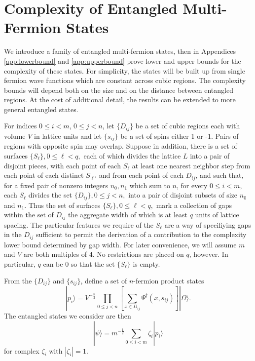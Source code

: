 \documentclass[twocolumn,amsmath,amssymb]{revtex4-1}
\begin{document}
\section{\label{sec:entangledstates} Complexity of Entangled Multi-Fermion States}

We introduce a family of entangled multi-fermion states, then in 
Appendices \ref{app:lowerbound} and \ref{app:upperbound}
prove lower and upper bounds for the complexity of these states.
For simplicity, the states will be built up from single fermion wave functions which
are constant across cubic regions. The complexity bounds
will depend both on the size and on the distance
between entangled regions.
At the cost of additional detail, the results can
be extended to more general entangled states.

For indices $0 \leq i < m $, $0 \leq j < n$, let $\{ D_{ij} \}$ be a set of 
cubic regions each with
volume $V$ in lattice units
and let $\{s_{ij}\}$ be a set of spins either 1 or -1. 
Pairs of regions with opposite spin may overlap.
Suppose in addition,
there is a set
of surfaces $\{S_\ell\}, 0 \le \ell < q,$ each of which divides the lattice
$L$ into a pair of disjoint pieces, with each point of each
$S_\ell$ at least one nearest neighbor step from
each point of each distinct $S_{\ell'}$ and from
each point of each $D_{ij}$, and such that,
for a fixed pair of nonzero integers $n_0, n_1$ which sum to $n$,
for every
$0 \le i < m$,
each $S_\ell$ divides the set
$\{D_{ij}\}, 0 \le j < n,$ into a pair of disjoint subsets of size $n_0$ and $n_1$.
Thus the set of surfaces
$\{S_\ell\}, 0 \le \ell < q,$ mark a collection
of gaps within the set of $D_{ij}$ the aggregate
width of which is at least $q$ units of lattice spacing.
The particular features we require
of the $S_\ell$ are a way of
specifiying gaps in the $D_{ij}$ sufficient
to permit the derivation of a contribution to the complexity
lower bound determined by gap width.
For later convenience, we will assume $m$ and $V$
are both multiples of 4. No restrictions
are placed on $q$, however. In particular, $q$ can be 0 so that the set
$\{S_\ell\}$ is empty.

From the $\{ D_{ij} \}$ and $\{s_{ij}\}$, define a set of $n$-fermion product states
\begin{equation}
\label{pstates}
|p_i \rangle  =  
V^{-\frac{n}{2}}\prod_{0 \leq j < n} \left[\sum_{x \in D_{ij}} \Psi^{\dagger}( x, s_{ij})\right] |\Omega \rangle .
\end{equation}
The entangled states we consider are then
\begin{equation}
  \label{entangledstate}
|\psi \rangle  = m^{-\frac{1}{2}}\sum_{0 \le i < m} \zeta_i |p_i \rangle 
\end{equation}
for complex $\zeta_i$ with $| \zeta_i| = 1$.
\end{document}
